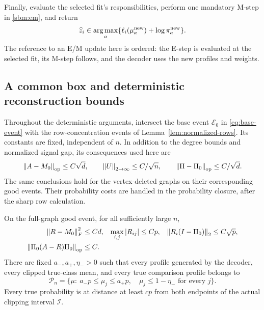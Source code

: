 Finally, evaluate the selected fit's responsibilities, perform one
mandatory M-step in \eqref{sbm:em}, and return
\begin{equation}
 \widehat z_i\in\operatorname*{arg\,max}_a
 \{\ell_i(\mu_a^{\rm new})+\log\pi_a^{\rm new}\}.
 \label{sbm:decode}
\end{equation}
The reference to an E/M update here is ordered: the E-step is evaluated
at the selected fit, its M-step follows, and the decoder uses the new
profiles and weights.

\subsection{A common box and deterministic reconstruction bounds}
\label{sbm:box-section}

Throughout the deterministic arguments, intersect the base event
$\mathcal E_0$ in \eqref{eq:base-event} with the row-concentration
events of Lemma~\ref{lem:normalized-rows}. Its constants are fixed,
independent of $n$. In addition to the degree bounds and normalized
signal gap, its consequences used here are
\begin{equation}
 \left\lVert A-M_0\right\rVert_{\mathrm{op}}\le C\sqrt d,\qquad
 \left\lVert U\right\rVert_{2\to\infty}\le C/\sqrt n,\qquad
 \left\lVert\Pi-\Pi_0\right\rVert_{\mathrm{op}}\le C/\sqrt d.
 \label{sbm:common-event}
\end{equation}
The same conclusions hold for the vertex-deleted graphs on their
corresponding good events. Their probability costs are handled in the
probability closure, after the sharp row calculation.

\begin{lemma}
\label{sbm:box}
On the full-graph good event, for all sufficiently large $n$,
\begin{align}
 \left\lVert R-M_0\right\rVert_F^2&\le Cd,
 &\max_{i,j}|R_{ij}|&\le Cp,
 &\left\lVert R_i(I-\Pi_0)\right\rVert_2&\le C\sqrt p,
 \label{sbm:reconstruction-bounds}\\
 \left\lVert\Pi_0(A-R)\Pi_0\right\rVert_{\mathrm{op}}&\le C.
 \label{sbm:block-residual}
\end{align}
There are fixed $a_-,a_+,\eta_->0$ such that every profile generated by
the decoder, every clipped true-class mean, and every true comparison
profile belongs to
\begin{equation}
 \mathcal P_n
 =\{\mu:\ a_-p\le\mu_j\le a_+p,\quad
                    \mu_j\le1-\eta_-\text{ for every }j\}.
 \label{sbm:box-def}
\end{equation}
Every true probability is at distance at least $cp$ from both endpoints
of the actual clipping interval $\mathcal I$.
\end{lemma}

